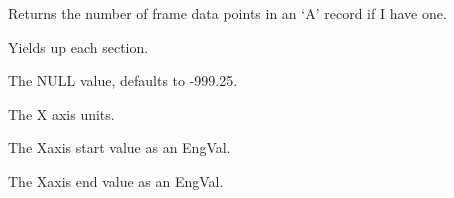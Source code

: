 \documentclass[letterpaper,10pt,english]{sphinxmanual}
\begin{document}
\begin{fulllineitems}
\begin{fulllineitems}
\label{\detokenize{ref/LAS/core/LASRead:TotalDepth.LAS.core.LASRead.LASBase.numDataPoints}}
Returns the number of frame data points in an ‘A’ record if I have one.

\end{fulllineitems}


\begin{fulllineitems}
\label{\detokenize{ref/LAS/core/LASRead:TotalDepth.LAS.core.LASRead.LASBase.genSects}}
Yields up each section.

\end{fulllineitems}


\begin{fulllineitems}
\label{\detokenize{ref/LAS/core/LASRead:TotalDepth.LAS.core.LASRead.LASBase.nullValue}}
The NULL value, defaults to -999.25.

\end{fulllineitems}


\begin{fulllineitems}
\label{\detokenize{ref/LAS/core/LASRead:TotalDepth.LAS.core.LASRead.LASBase.xAxisUnits}}
The X axis units.

\end{fulllineitems}


\begin{fulllineitems}
\label{\detokenize{ref/LAS/core/LASRead:TotalDepth.LAS.core.LASRead.LASBase.xAxisStart}}
The Xaxis start value as an EngVal.

\end{fulllineitems}


\begin{fulllineitems}
\label{\detokenize{ref/LAS/core/LASRead:TotalDepth.LAS.core.LASRead.LASBase.xAxisStop}}
The Xaxis end value as an EngVal.


\end{fulllineitems}
\end{fulllineitems}
\end{document}
